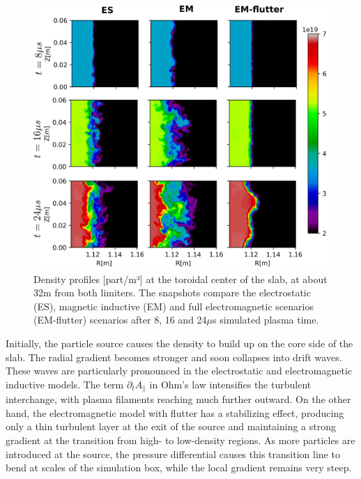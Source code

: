 \begin{figure}[H]\centering
	\centering
	\includegraphics[width=.95\textwidth]{schemes/slab_source.png}
	\caption[Density profiles at the toroidal center of the slab, at about 32m from both limiters]{Density profiles [part/m³] at the toroidal center of the slab, at about 32m from both limiters. The snapshots compare the electrostatic (ES), magnetic inductive (EM) and full electromagnetic scenarios (EM-flutter) scenarios after 8, 16 and 24$\mu$s simulated plasma time.}
	\label{fig:SLABturb}
\end{figure}

Initially, the particle source causes the density to build up on the core side of the slab. The radial gradient becomes stronger and soon collapses into drift waves. These waves are particularly pronounced in the electrostatic and electromagnetic inductive models. The term $\partial_t A_\parallel$ in Ohm's law intensifies the turbulent interchange, with plasma filaments reaching much further outward. On the other hand, the electromagnetic model with flutter has a stabilizing effect, producing only a thin turbulent layer at the exit of the source and maintaining a strong gradient at the transition from high- to low-density regions. As more particles are introduced at the source, the pressure differential causes this transition line to bend at scales of the simulation box, while the local gradient remains very steep. \newline




